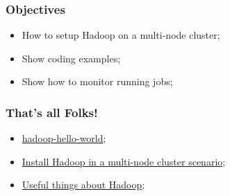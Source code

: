 \documentclass[aspectratio=169]{beamer}
\begin{document}
\begin{frame}
	\frametitle{Objectives}
	
	\begin{itemize}
	    \item How to setup Hadoop on a multi-node cluster;
	    \item Show coding examples;
		\item Show how to monitor running jobs;
	\end{itemize}
\end{frame}

\begin{frame}
    \frametitle{That's all Folks!}

	\begin{itemize}
	    \item \href{https://github.com/claudioscheer/hadoop-hello-world}{hadoop-hello-world};
	    \item \href{https://github.com/claudioscheer/claudioscheer.github.io/blob/master/posts/hadoop/install-hadoop-multi-node-cluster.md}{Install Hadoop in a multi-node cluster scenario};
	    \item \href{https://github.com/claudioscheer/claudioscheer.github.io/blob/master/posts/hadoop/useful-things-about-hadoop.md}{Useful things about Hadoop};
	\end{itemize}
\end{frame}
\end{document}
